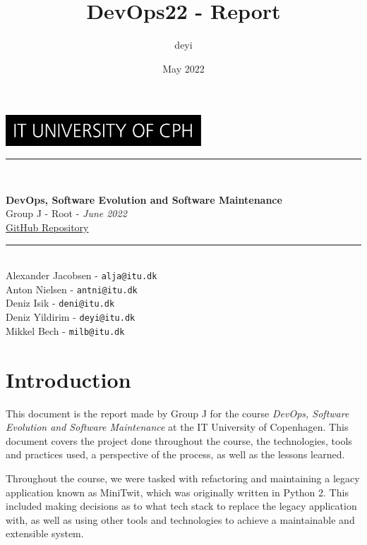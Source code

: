 \documentclass{article}
\title{DevOps22 - Report}
\author{deyi}
\date{May 2022}
\newcommand{\HRule}{\rule{\linewidth}{0.5mm}}
\begin{document}
\begin{titlepage}
\begin{center}

\includegraphics[width=0.55\textwidth]{images/ITU.jpg}~\\[2cm]


\HRule \\[0.4cm]
{ \LARGE 
  \textbf{DevOps, Software Evolution and Software Maintenance}\\[0.4cm]
  Group J - Root - \textit{June 2022} \\
  \href{https://github.com/AlexBMJ/minitwit}{GitHub Repository}

}
\HRule \\[1.5cm]

{
\large
Alexander Jacobsen - \texttt{alja@itu.dk} \\[0.1cm]
Anton Nielsen - \texttt{antni@itu.dk} \\[0.1cm]
Deniz Isik - \texttt{deni@itu.dk} \\[0.1cm]
Deniz Yildirim - \texttt{deyi@itu.dk} \\[0.1cm]
Mikkel Bech - \texttt{milb@itu.dk} \\[0.1cm]
}


\vfill

\end{center}
\end{titlepage}

\tableofcontents

\newpage
\section{Introduction}
This document is the report made by Group J for the course \textit{DevOps, Software Evolution and Software Maintenance} at the IT University of Copenhagen. This document covers the project done throughout the course, the technologies, tools and practices used, a perspective of the process, as well as the lessons learned.


Throughout the course, we were tasked with refactoring and maintaining a legacy application known as MiniTwit, which was originally written in Python 2. This included making decisions as to what tech stack to replace the legacy application with, as well as using other tools and technologies to achieve a maintainable and extensible system. 
\end{document}
